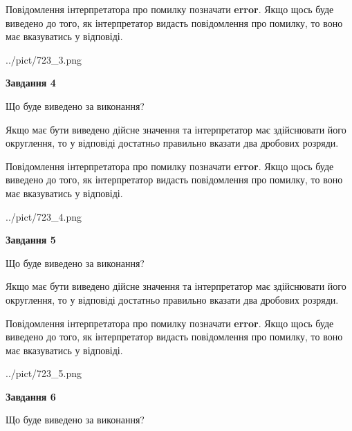 \documentclass[12pt, ukrainian]{article}
\begin{document}
{\begin {Large}
Повідомлення інтерпретатора про помилку позначати \textbf{error}.
Якщо щось буде виведено до того, як інтерпретатор видасть повідомлення про помилку, 
то воно має вказуватись у відповіді. \par

\begin{center}
	{../pict/723_3.png}
\end{center}
\newpage

{\begin {center}\textbf{Завдання 4}\end {center}}\par
Що буде виведено за виконання? \par

Якщо має бути виведено дійсне значення та інтерпретатор має здійснювати його округлення, 
то у відповіді достатньо правильно вказати два дробових розряди.

Повідомлення інтерпретатора про помилку позначати \textbf{error}.
Якщо щось буде виведено до того, як інтерпретатор видасть повідомлення про помилку, 
то воно має вказуватись у відповіді. \par

\begin{center}
	{../pict/723_4.png}
\end{center}
\newpage

{\begin {center}\textbf{Завдання 5}\end {center}}\par
Що буде виведено за виконання? \par

Якщо має бути виведено дійсне значення та інтерпретатор має здійснювати його округлення, 
то у відповіді достатньо правильно вказати два дробових розряди.

Повідомлення інтерпретатора про помилку позначати \textbf{error}.
Якщо щось буде виведено до того, як інтерпретатор видасть повідомлення про помилку, 
то воно має вказуватись у відповіді. \par

\begin{center}
	{../pict/723_5.png}
\end{center}
\newpage

{\begin {center}\textbf{Завдання 6}\end {center}}\par
Що буде виведено за виконання? \par


\end{Large}}
\end{document}
